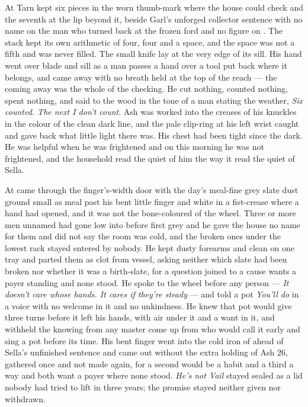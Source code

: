 At  Tarn kept six pieces in the worn thumb-mark where the house could check and the seventh at the lip beyond it, beside Garl's unforged collector sentence with no name on the man who turned back at the frozen ford and no figure on . The stack kept its own arithmetic of four, four and a space, and the space was not a fifth and was never filled. The small knife lay at the very edge of its sill. His hand went over blade and sill as a man passes a hand over a tool put back where it belongs, and came away with no breath held at the top of the reach --- the coming away was the whole of the checking. He cut nothing, counted nothing, spent nothing, and said to the wood in the tone of a man stating the weather, \emph{Six counted. The next I don't count}. Ash was worked into the creases of his knuckles in the colour of the clean dark line, and the pale clip-ring at his left wrist caught and gave back what little light there was. His chest had been tight since the dark. He was helpful when he was frightened and on this morning he was not frightened, and the household read the quiet of him the way it read the quiet of Sella.

At   came through the finger's-width door with the day's meal-fine grey slate dust ground small as meal past his bent little finger and white in a fist-crease where a hand had opened, and it was not the bone-coloured  of the wheel. Three or more men unnamed had gone low into  before first grey and he gave the house no name for them and did not say the room was cold, and the broken ones under the lowest rack stayed entered by nobody. He kept dusty forearms and clean on one tray and parted them as clot from vessel, asking neither which slate had been broken nor whether it was a birth-slate, for a question joined to a cause wants a payer standing and none stood. He spoke to the wheel before any person --- \emph{It doesn't care whose hands. It cares if they're steady} --- and told a pot \emph{You'll do} in a voice with no welcome in it and no unkindness. He knew  that pot would give three turns before it left his hands, with air under it and a want in it, and withheld the knowing from any master come up from  who would call it early and sing a pot before its time. His bent finger went into the cold iron of  ahead of Sella's unfinished sentence and came out without the extra holding of Ash 26, gathered once and not made again, for a second would be a habit and a third a way and both want a payer where none stood. \emph{He's not Vail} stayed sealed as a lid nobody had tried to lift in three years; the promise stayed neither given nor withdrawn.

